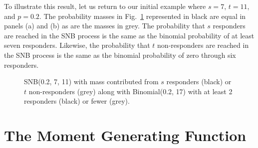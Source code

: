 \documentclass[review]{elsarticle}
\begin{document}
To illustrate this result, let us return to our initial example
where $s=7$, $t=11$, and $p=0.2$.  The probability masses in
Fig.~\ref{fig:snb_bin_compare} represented in 
black are equal in panels (a) and (b) as are the masses in grey.
The probability that $s$
responders are reached in the SNB process is the same as the binomial 
probability of at least seven responders. Likewise, the probability that $t$ 
non-responders are reached in the SNB process is the same as the binomial
probability of zero through six responders.

\begin{figure}[t!]
\centering
{}
\hfill
{}
\caption{
SNB(0.2, 7, 11) with mass contributed from 
$s$ responders (black) or $t$ non-responders (grey) along with 
Binomial(0.2, 17) with at least 2 responders (black) or fewer (grey).
}
\label{fig:snb_bin_compare}
\end{figure}

\section{The Moment Generating Function}
\end{document}
